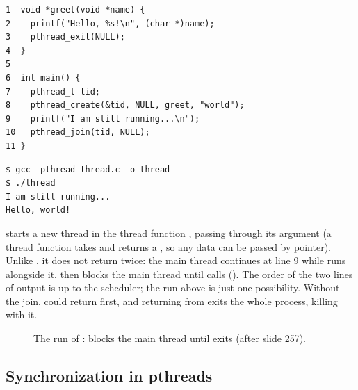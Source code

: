 \begin{example}
\label{ex:pthread}
\begin{lstlisting}[morekeywords={pthread_t}]
1  void *greet(void *name) {
2    printf("Hello, %s!\n", (char *)name);
3    pthread_exit(NULL);
4  }
5
6  int main() {
7    pthread_t tid;
8    pthread_create(&tid, NULL, greet, "world");
9    printf("I am still running...\n");
10   pthread_join(tid, NULL);
11 }
\end{lstlisting}
\begin{lstlisting}[style=sh]
$ gcc -pthread thread.c -o thread
$ ./thread
I am still running...
Hello, world!
\end{lstlisting}
   starts a new thread in the thread function , passing  through its  argument (a thread function takes and returns a , so any data can be passed by pointer). Unlike , it does not return twice: the main thread continues at line 9 while  runs alongside it.  then blocks the main thread until  calls  (). The order of the two lines of output is up to the scheduler; the run above is just one possibility. Without the join,  could return first, and returning from  exits the whole process, killing  with it.
\end{example}

\begin{figure}[htbp]
\centering
{}
\caption{The run of :  blocks the main thread until  exits (after slide 257).}
\label{fig:pthread}
\end{figure}

\subsection{Synchronization in pthreads}

